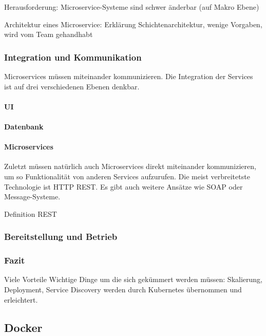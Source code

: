 Herausforderung: Microservice-Systeme sind schwer änderbar (auf Makro Ebene)

Architektur eines Microservice: Erklärung Schichtenarchitektur, wenige Vorgaben, wird vom Team gehandhabt

\subsubsection{Integration und Kommunikation}

Microservices müssen miteinander kommunizieren. Die Integration der Services ist auf drei verschiedenen Ebenen denkbar.

\paragraph{UI}

\paragraph{Datenbank}

\paragraph{Microservices}

Zuletzt müssen natürlich auch Microservices direkt miteinander kommunizieren, um so Funktionalität von anderen Services aufzurufen. Die meist verbreitetste Technologie ist HTTP REST. Es gibt auch weitere Ansätze wie SOAP oder Message-Systeme.

{Definition REST}


\subsubsection{Bereitstellung und Betrieb}



\subsubsection{Fazit}

Viele Vorteile
Wichtige Dinge um die sich gekümmert werden müssen: Skalierung, Deployment, Service Discovery werden durch Kubernetes übernommen und erleichtert.


\subsection{Docker}

